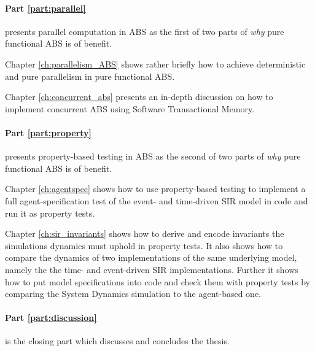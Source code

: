 \medskip

\paragraph{Part \ref{part:parallel}} presents parallel computation in ABS as the first of two parts of \textit{why} pure functional ABS is of benefit.
\medskip

Chapter \ref{ch:parallelism_ABS} shows rather briefly how to achieve deterministic and pure parallelism in pure functional ABS. 

\medskip

Chapter \ref{ch:concurrent_abs} presents an in-depth discussion on how to implement concurrent ABS using Software Transactional Memory.

\medskip

\paragraph{Part \ref{part:property}} presents property-based testing in ABS as the second of two parts of \textit{why} pure functional ABS is of benefit.
\medskip

Chapter \ref{ch:agentspec} shows how to use property-based testing to implement a full agent-specification test of the event- and time-driven SIR model in code and run it as property tests.

\medskip

Chapter \ref{ch:sir_invariants} shows how to derive and encode invariants the simulations dynamics must uphold in property tests. It also shows how to compare the dynamics of two implementations of the same underlying model, namely the the time- and event-driven SIR implementations. Further it shows how to put model specifications into code and check them with property tests by comparing the System Dynamics simulation to the agent-based one.

\medskip

\paragraph{Part \ref{part:discussion}} is the closing part which discusses and concludes the thesis. 
\medskip


